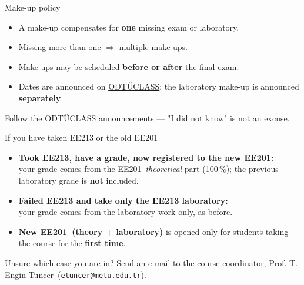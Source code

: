 \documentclass[11pt,aspectratio=169]{beamer}
\makeatletter
\newcommand{\coursecode}{EE201}
\newcommand{\odtuclass}{https://odtuclass.metu.edu.tr}
\newcommand{\coordinator}{Prof. T. Engin Tuncer}
\newcommand{\coordinatormail}{etuncer@metu.edu.tr}
\makeatother
\begin{document}
\begin{frame}{Make-up policy}
  \begin{itemize}
    \item A make-up compensates for \textbf{one} missing exam or laboratory.
    \item Missing more than one $\Rightarrow$ multiple make-ups.
    \item Make-ups may be scheduled \textbf{before or after} the final exam.
    \item Dates are announced on \href{\odtuclass}{ODTÜCLASS};
          the laboratory make-up is announced \textbf{separately}.
  \end{itemize}
  \vfill
  \centering\small\color{metugray}
  Follow the ODTÜCLASS announcements --- "I did not know" is not an excuse.
\end{frame}

\begin{frame}{If you have taken EE213 or the old \coursecode}
  \begin{itemize}
    \item \textbf{Took EE213, have a grade, now registered to the new \coursecode:}\\
          your grade comes from the \coursecode\ \emph{theoretical} part (100\,\%);
          the previous laboratory grade is \textbf{not} included.
    \item \textbf{Failed EE213 and take only the EE213 laboratory:}\\
          your grade comes from the laboratory work only, as before.
    \item \textbf{New \coursecode\ (theory + laboratory)} is opened only for students
          taking the course for the \textbf{first time}.
  \end{itemize}
  \vfill
  \centering\small\color{metugray}
  Unsure which case you are in? Send an e-mail to the course coordinator,
  \coordinator\ (\texttt{\coordinatormail}).
\end{frame}

\end{document}
